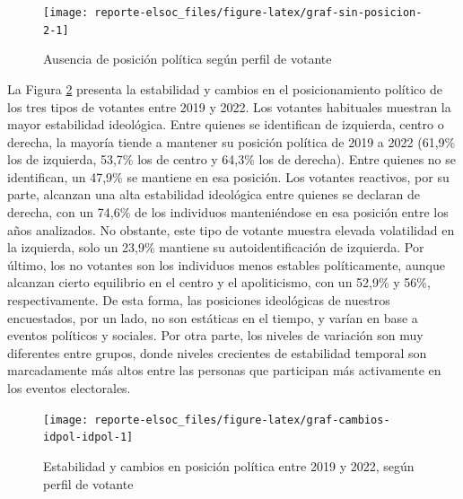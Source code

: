 \documentclass[
  12pt,
]{book}
\begin{document}
\begin{figure}

{\centering \texttt{[image: reporte-elsoc\_files/figure-latex/graf-sin-posicion-2-1]} 

}

\caption{Ausencia de posición política según perfil de votante}\label{fig:graf-sin-posicion-2}
\end{figure}

La Figura \ref{fig:graf-cambios-idpol-idpol} presenta la estabilidad y cambios en el posicionamiento político de los tres tipos de votantes entre 2019 y 2022. Los votantes habituales muestran la mayor estabilidad ideológica. Entre quienes se identifican de izquierda, centro o derecha, la mayoría tiende a mantener su posición política de 2019 a 2022 (61,9\% los de izquierda, 53,7\% los de centro y 64,3\% los de derecha). Entre quienes no se identifican, un 47,9\% se mantiene en esa posición. Los votantes reactivos, por su parte, alcanzan una alta estabilidad ideológica entre quienes se declaran de derecha, con un 74,6\% de los individuos manteniéndose en esa posición entre los años analizados. No obstante, este tipo de votante muestra elevada volatilidad en la izquierda, solo un 23,9\% mantiene su autoidentificación de izquierda. Por último, los no votantes son los individuos menos estables políticamente, aunque alcanzan cierto equilibrio en el centro y el apoliticismo, con un 52,9\% y 56\%, respectivamente. De esta forma, las posiciones ideológicas de nuestros encuestados, por un lado, no son estáticas en el tiempo, y varían en base a eventos políticos y sociales. Por otra parte, los niveles de variación son muy diferentes entre grupos, donde niveles crecientes de estabilidad temporal son marcadamente más altos entre las personas que participan más activamente en los eventos electorales.

\begin{figure}

{\centering \texttt{[image: reporte-elsoc\_files/figure-latex/graf-cambios-idpol-idpol-1]} 

}

\caption{Estabilidad y cambios en posición política entre 2019 y 2022, según perfil de votante}\label{fig:graf-cambios-idpol-idpol}
\end{figure}
\end{document}
